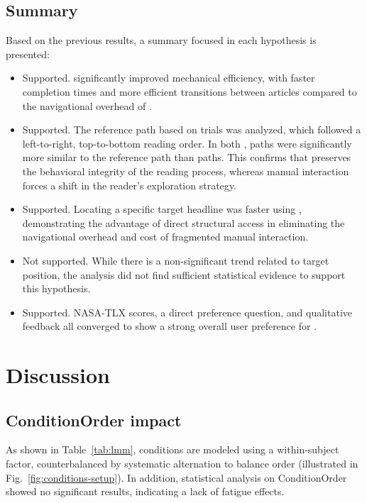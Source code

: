 \subsection{Summary}
Based on the previous results, a summary focused in each hypothesis is presented:
\begin{itemize}
    \item[\hypperformance]Supported. \condtwonot significantly improved mechanical efficiency, with faster completion times and more efficient transitions between articles compared to the navigational overhead of \condonenot.

    \item[\hyppath]Supported. The reference path based on \condzeronot trials was analyzed, which followed a left-to-right, top-to-bottom reading order. In both \CVAS, \condtwonot paths were significantly more similar to the reference path than \condonenot paths. This confirms that \condtwonot preserves the behavioral integrity of the reading process, whereas manual interaction forces a shift in the reader's exploration strategy.

    \item[\hypfindingperformance]Supported. Locating a specific target headline was faster using \condtwonot, demonstrating the advantage of direct structural access in eliminating the navigational overhead and cost of fragmented manual interaction.

    \item[\hypfindingpositions]Not supported. While there is a non-significant trend related to target position, the analysis did not find sufficient statistical evidence to support this hypothesis.

    \item[\hyppreference]Supported. NASA-TLX scores, a direct preference question, and qualitative feedback all converged to show a strong overall user preference for \condtwonot.
\end{itemize}


\section{Discussion}
\label{sec:magnification-discussion}

\subsection*{ConditionOrder impact}
As shown in Table~\ref{tab:lmm}, conditions are modeled using a within-subject factor,  counterbalanced  by systematic alternation to balance order (illustrated in Fig.~\ref{fig:conditions-setup}).
In addition, statistical analysis on ConditionOrder showed no significant results, indicating a lack of fatigue effects.

